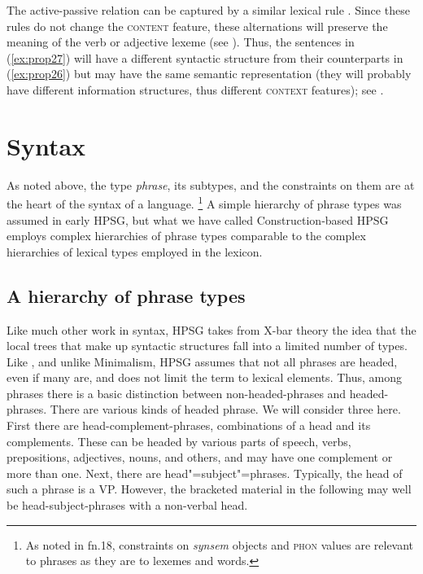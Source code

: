 \documentclass[output=paper
	        ,collection
	        ,collectionchapter
 	        ,biblatex
                ,babelshorthands
                ,newtxmath
                ,draftmode
                ,colorlinks, citecolor=brown
]{langscibook}
\begin{document}
The active-passive relation can be captured by a similar lexical rule \citep{Flickinger87}. Since these rules do not change the \textsc{content} feature, these alternations will preserve the meaning of the verb or adjective lexeme (see ). Thus, the sentences in (\ref{ex:prop27}) will have a different syntactic structure from their counterparts in (\ref{ex:prop26}) but may have the same semantic representation (they will probably have different information structures, thus different \textsc{context} features); see .


\section{Syntax}\label{sec:prop5}
\label{prop:sec-syntax}

As noted above, the type \emph{phrase}, its subtypes, and the constraints on them are at the heart of the syntax of a language.%
%
\footnote{As noted in fn.18, constraints on \emph{synsem} objects and \textsc{phon} values are relevant to phrases as they are to lexemes and words.}
%
A simple hierarchy of phrase types was assumed in early HPSG, but what we have called Construction-based HPSG employs complex hierarchies of phrase types comparable to the complex hierarchies of lexical types employed in the lexicon.

\subsection{A hierarchy of phrase types}\label{sec:prop5.1}

Like much other work in syntax, HPSG takes from X-bar theory \citep{Jackendoff77a} the idea that the local trees that make up syntactic structures fall into a limited number of types. Like \citet{Jackendoff77a}, and unlike Minimalism, HPSG assumes that not all phrases are headed, even if many are, and does not limit the term  to lexical elements. Thus, among phrases there is a basic distinction between non-headed-phrases and headed-phrases. There are various kinds of headed phrase. We will consider three here. First there are head-complement-phrases, combinations of a head and its complements. These can be headed by various parts of speech, verbs, prepositions, adjectives, nouns, and others, and may have one complement or more than one. Next, there are head"=subject"=phrases. Typically, the head of such a phrase is a VP. However, the bracketed material in the following may well be head-subject-phrases with a non-verbal head. 
\end{document}
